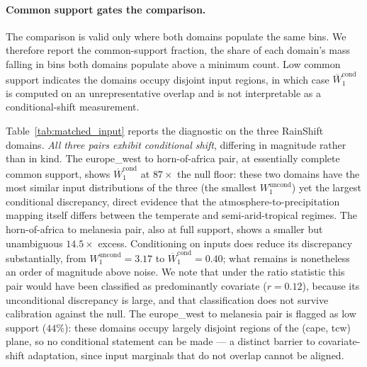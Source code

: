 \documentclass{article}
\begin{document}
\paragraph{Common support gates the comparison.}
The comparison is valid only where both domains populate the same bins.
We therefore report the common-support fraction, the share of each
domain's mass falling in bins both domains populate above a minimum
count. Low common support indicates the domains occupy disjoint input
regions, in which case $\overline{W}_1^{\text{cond}}$ is computed on an
unrepresentative overlap and is not interpretable as a conditional-shift
measurement.

Table~\ref{tab:matched_input} reports the diagnostic on the three
RainShift domains. \emph{All three pairs exhibit conditional shift},
differing in magnitude rather than in kind. The europe\_west to
horn-of-africa pair, at essentially complete common support, shows
$\overline{W}_1^{\text{cond}}$ at $87\times$ the null floor: these two
domains have the most similar input distributions of the three (the
smallest $W_1^{\text{uncond}}$) yet the largest conditional
discrepancy, direct evidence that the atmosphere-to-precipitation
mapping itself differs between the temperate and semi-arid-tropical
regimes. The horn-of-africa to melanesia pair, also at full support,
shows a smaller but unambiguous $14.5\times$ excess. Conditioning on
inputs does reduce its discrepancy substantially, from
$W_1^{\text{uncond}}=3.17$ to $\overline{W}_1^{\text{cond}}=0.40$;
what remains is nonetheless an order of magnitude above noise. We note
that under the ratio statistic this pair would have been classified as
predominantly covariate ($r=0.12$), because its unconditional
discrepancy is large, and that classification does not survive
calibration against the null. The europe\_west to melanesia pair is
flagged as low support ($44\%$): these domains occupy largely disjoint
regions of the (cape, tcw) plane, so no conditional statement can be
made --- a distinct barrier to covariate-shift adaptation, since input
marginals that do not overlap cannot be aligned.
\end{document}
